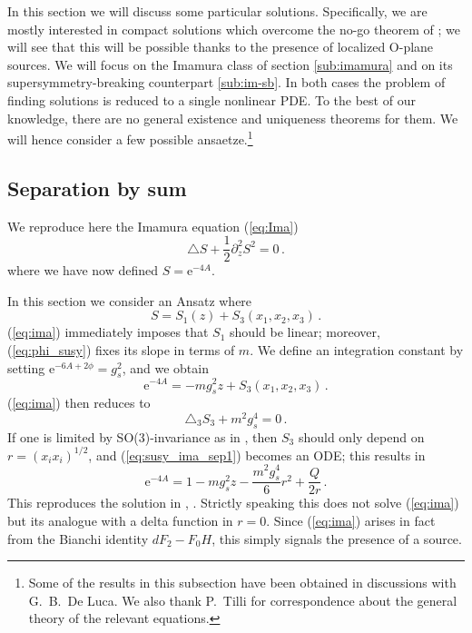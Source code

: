 \documentclass[12pt]{article}
\newcommand{\e}{\mathrm{e}}
\begin{document}
In this section we will discuss some particular solutions. Specifically, we are mostly interested in compact solutions which overcome the no-go theorem of \cite{maldacena-nunez}; we will see that this will be possible thanks to the presence of localized O-plane sources. We will focus on the Imamura class of section \ref{sub:imamura} and on its supersymmetry-breaking counterpart \ref{sub:im-sb}. In both cases the problem of finding solutions is reduced to a single nonlinear PDE. To the best of our knowledge, there are no general existence and uniqueness theorems for them. We will hence consider a few possible ansaetze.\footnote{Some of the results in this subsection have been obtained in discussions with G.~B.~De Luca. We also thank P.~Tilli for correspondence about the general theory of the relevant equations.}


\subsection{Separation by sum} \label{sub:sep-sum}

We reproduce here the Imamura equation (\ref{eq:Ima}) 
\begin{equation}\label{eq:ima}
	\triangle S + \frac12 \partial_z^2 S^2 = 0 \,.
\end{equation}
where we have now defined $S=\e^{-4A}$.

In this section we consider an Ansatz where
\begin{equation}\label{eq:sep-sum0}
	S = S_1(z)+ S_3(x_1,x_2,x_3)\,.
\end{equation}
(\ref{eq:ima}) immediately imposes that $S_1$ should be linear; moreover, (\ref{eq:phi_susy}) fixes its slope in terms of $m$. We define an integration constant by setting $\e^{-6A+2\phi} = g_s^2$, and we obtain
\begin{equation}\label{eq:sep-sum}
\e^{-4A} = - m g_s^2 z + S_3(x_1,x_2,x_3)\,.
\end{equation}
(\ref{eq:ima}) then reduces to
\begin{equation}
\label{eq:susy_ima_sep1}
\triangle_3 S_3 + m^2 g_s^4 = 0 \, .
\end{equation}
If one is limited by SO(3)-invariance as in \cite{imamura}, then $S_3$ should only depend on $r=(x_i x_i)^{1/2}$, and (\ref{eq:susy_ima_sep1}) becomes an ODE; this results in 
\begin{equation}\label{eq:mD6}
\e^{-4A} = 1- m g_s^2 z - \frac{m^2 g_s^4}{6} r^2 + \frac{Q}{2 r} \,.
\end{equation}
This reproduces the solution in \cite[(26)]{janssen-meessen-ortin}, \cite[(5.7)]{imamura}. Strictly speaking this does not solve (\ref{eq:ima}) but its analogue with a delta function in $r=0$. Since (\ref{eq:ima}) arises in fact from the Bianchi identity $dF_2-F_0 H$, this simply signals the presence of a source. 
\end{document}
